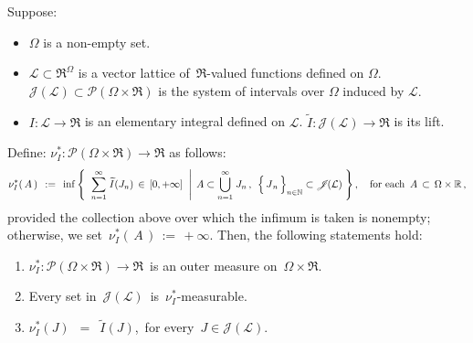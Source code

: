 
\begin{lemma}
\mbox{}\vskip 0.1cm
\noindent
Suppose:
\begin{itemize}
\item
	$\Omega$ is a non-empty set.
\item
	$\mathcal{L} \subset \Re^{\Omega}$ is a vector lattice of \,$\Re$-valued functions defined on $\Omega$.
	\vskip 0.05cm
	$\mathscr{J}\!(\mathcal{L}) \subset \mathcal{P}\!\left(\Omega\times\Re\right)$ is the system of intervals
	over $\Omega$ induced by $\mathcal{L}$.
\item
	$I : \mathcal{L} \longrightarrow \Re$ is an elementary integral defined on $\mathcal{L}$.
	\vskip 0.05cm
	$\widetilde{I} : \mathscr{J}\!(\mathcal{L}) \longrightarrow \Re$ is its lift.
\end{itemize}
Define:\;
$\nu^{*}_{I} : \mathcal{P}(\Omega\times\Re) \longrightarrow \Re$ as follows:
\begin{equation*}
\nu^{*}_{I}\!\left(\,A\,\right) 
\;\, := \;\,
	\inf\left\{\;\,
	\left.
		\overset{\infty}{\underset{n=1}{\sum}}\; \widetilde{I}(J_{n}) \,\in\, [0,+\infty]
	\;\;\right\vert\;
		A \subset \overset{\infty}{\underset{n=1}{\bigcup}}\;J_{n}\,,\;\,
		\left\{\,\overset{{\color{white}.}}{J}_{n}\,\right\}_{n\in\N} \subset \mathscr{J}\!(\mathcal{L})
	\;\right\},
\quad
\textnormal{for each \,$A \,\subset\, \Omega \times \Re$}\,,
\end{equation*}
provided the collection above over which the infimum is taken is nonempty;
otherwise, we set \,$\nu^{*}_{I}\!\left(\,A\,\right) \,:=\, +\infty$.
\vskip 0.1cm
\noindent
Then, the following statements hold:
\begin{enumerate}
\item
	$\nu^{*}_{I} : \mathcal{P}(\Omega\times\Re) \longrightarrow \Re$\,
	is an outer measure on \,$\Omega \times \Re$.
\item
	Every set in \,$\mathscr{J}\!(\mathcal{L})$\, is \,$\nu^{*}_{I}$-measurable.
\item
	$\nu^{*}_{I}(J)$ \,$=$\, $\widetilde{I}(J)$,\, for every \,$J \in \mathscr{J}\!(\mathcal{L})$.
\end{enumerate}
\end{lemma}


\renewcommand{\theenumi}{\roman{enumi}}
\renewcommand{\labelenumi}{\textnormal{(\theenumi)}$\;\;$}

